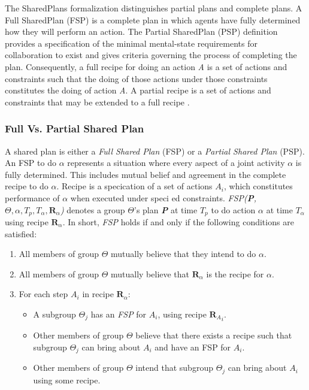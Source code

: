 \documentclass[11pt]{article}
\begin{document}
The SharedPlans formalization distinguishes partial plans and complete plans. A
Full SharedPlan (FSP) is a complete plan in which agents have fully determined
how they will perform an action. The Partial SharedPlan (PSP) definition
provides a specification of the minimal mental-state requirements for
collaboration to exist and gives criteria governing the process of completing
the plan. Consequently, a full recipe for doing an action \textit{A} is a set of
actions and constraints such that the doing of those actions under those
constraints constitutes the doing of action \textit{A}. A partial recipe is a
set of actions and constraints that may be extended to a full recipe
\cite{grosz:planning-acting}.

\subsubsection{Full Vs. Partial Shared Plan}
\label{sec:full-partial-plan}

A shared plan is either a \textit{Full Shared Plan} (FSP) or a \textit{Partial
Shared Plan} (PSP). An FSP to do $\alpha$ represents a situation where every
aspect of a joint activity $\alpha$ is fully determined. This includes mutual
belief and agreement in the complete recipe to do $\alpha$. Recipe is a
specication of a set of actions \textit{$A_i$}, which constitutes performance of
$\alpha$ when executed under speci ed constraints. \textit{FSP(\textbf{P},
$\Theta, \alpha, T_p, T_\alpha, \textbf{R}_\alpha$)} denotes a group $\Theta$'s
plan \textit{\textbf{P}} at time \textit{$T_p$} to do action $\alpha$ at time
\textit{$T_\alpha$} using recipe \textit{$\textbf{R}_\alpha$}. In short,
\textit{FSP} holds if and only if the following conditions are satisfied:

\begin{enumerate}
  \item All members of group $\Theta$ mutually believe that they intend to do
  $\alpha$.
  \item All members of group $\Theta$ mutually believe that
  \textit{$\textbf{R}_\alpha$} is the recipe for $\alpha$.
  \item For each step \textit{$A_i$} in recipe \textit{$\textbf{R}_\alpha$}:
  \begin{itemize}
    \item A subgroup $\Theta_j$ has an \textit{FSP} for \textit{$A_i$}, using
    recipe \textit{${\textbf{R}_A}_i$}.
    \item Other members of group $\Theta$ believe that there exists a recipe
    such that subgroup $\Theta_j$ can bring about \textit{$A_i$} and have an FSP
    for \textit{$A_i$}.
    \item Other members of group $\Theta$ intend that subgroup $\Theta_j$ can
    bring about \textit{$A_i$} using some recipe.
  \end{itemize}
\end{enumerate}
\end{document}
